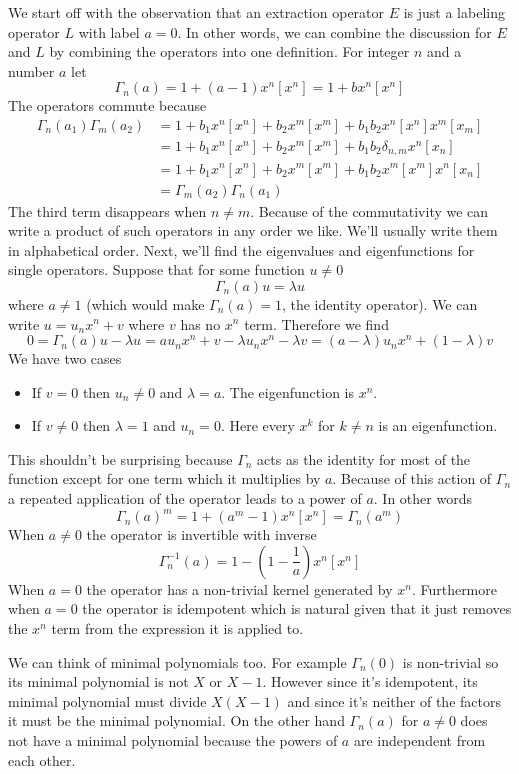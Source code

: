 We start off with the observation that an extraction operator $E$ is just a labeling operator $L$ with label $a = 0$. In other words, we can combine the discussion for $E$ and $L$ by combining the operators into one definition. For integer $n$ and a number $a$ let
\[
	\Gamma_n(a) = 1 + (a-1)x^n[x^n] = 1  + bx^n[x^n]
\]
The operators commute because
\begin{align*}
	\Gamma_n(a_1)\Gamma_m(a_2) &= 1  +b_1x^n[x^n]+b_2x^m[x^m] + b_1b_2x^n[x^n]x^m[x_m] \\
						&= 1  +b_1x^n[x^n]+b_2x^m[x^m] + b_1b_2\delta_{n,m}x^n[x_n]\\
						&= 1  +b_1x^n[x^n]+b_2x^m[x^m] + b_1b_2x^m[x^m]x^n[x_n]\\
						&= \Gamma_m(a_2)\Gamma_n(a_1)
\end{align*}
The third term disappears when $n \neq m$. Because of the commutativity we can write a product of such operators in any order we like. We'll usually write them in alphabetical order. Next, we'll find the eigenvalues and eigenfunctions for single operators. Suppose that for some function $u \neq 0$
\[
	\Gamma_n(a) u  = \lambda u
\]
where $a \neq 1$ (which would make $\Gamma_n(a) = 1$, the identity operator). We can write $u = u_n x^n + v$ where $v$ has no $x^n$ term. Therefore we find
\[
	0 = \Gamma_n(a) u - \lambda u = au_nx^n + v - \lambda u_n x^n -\lambda v = (a-\lambda)u_n x^n + (1-\lambda)v
\]
We have two cases
\begin{itemize}
\item If $v = 0$ then $u_n \neq 0$ and $\lambda = a$. The eigenfunction is $x^n$.
\item If $v \neq 0$ then $\lambda = 1$ and $u_n = 0$. Here every $x^k$ for $k\neq n$ is an eigenfunction.
\end{itemize}
This shouldn't be surprising because $\Gamma_n$ acts as the identity for most of the function except for one term which it multiplies by $a$. Because of this action of $\Gamma_n$ a repeated application of the operator leads to a power of $a$. In other words
\[
	\Gamma_n(a)^m = 1 + (a^m-1)x^n[x^n] = \Gamma_n(a^m)
\]
When $a \neq 0$ the operator is invertible with inverse
\[
	\Gamma_n^{-1}(a) = 1 - \left(1- \frac{1}{a}\right)x^n[x^n]
\]
When $a = 0$ the operator has a non-trivial kernel generated by $x^n$. Furthermore when $a = 0$ the operator is idempotent which is natural given that it just removes the $x^n$ term from the expression it is applied to.

We can think of minimal polynomials too. For example $\Gamma_n(0)$ is non-trivial so its minimal polynomial is not $X$ or $X-1$. However since it's idempotent, its minimal polynomial must divide $X(X-1)$ and since it's neither of the factors it must be the minimal polynomial. On the other hand $\Gamma_n(a)$ for $a\neq 0$ does not have a minimal polynomial because the powers of $a$ are independent from each other.

